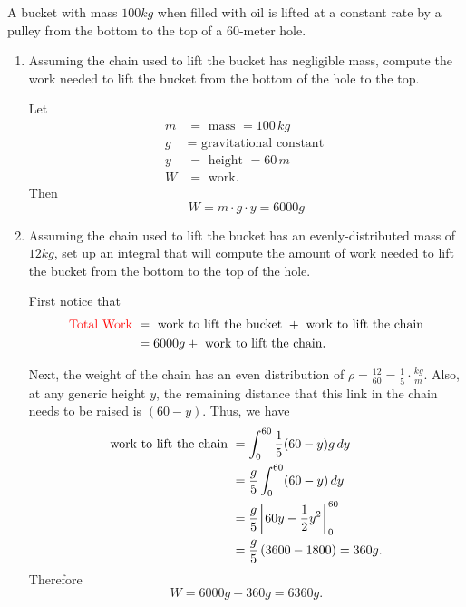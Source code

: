 \documentclass[]{ximera}
\begin{document}
\begin{problem}
\begin{enumerate}
	\end{enumerate}
		
\end{problem}

\begin{instructorNotes}

\end{instructorNotes}







\begin{problem}
A bucket with mass $100kg$ when filled with oil is lifted at a constant rate by a pulley from the bottom to the top of a $60$-meter hole.
	\begin{enumerate}
		\item  Assuming the chain used to lift the bucket has negligible mass, compute the work needed to lift the bucket from the bottom of the hole to the top.  
		\begin{freeResponse}
		Let
			\begin{align*}
			m &= \text{ mass } = 100 \, kg  \\
			g &= \text{ gravitational constant }  \\
			y &= \text{ height } = 60 \, m  \\
			W &= \text{ work}.
			\end{align*}
		Then
			\[
			W = m \cdot g \cdot y = 6000 g
			\]
		\end{freeResponse}
		
		
		
		\item  Assuming the chain used to lift the bucket has an evenly-distributed mass of $12kg$, set up an integral that will compute the amount of work needed to lift the bucket from the bottom to the top of the hole.  
		\begin{freeResponse}
		First notice that
			\begin{align*}
			\text{{\color{red}Total Work} } &= \text{ work to lift the bucket } + \text{ work to lift the chain}  \\
			&= 6000 g + \text{ work to lift the chain}.
			\end{align*}
		
		Next, the weight of the chain has an even distribution of $\rho = \frac{12}{60} = \frac{1}{5} \cdot \frac{kg}{m}$.  
		Also, at any generic height $y$, the remaining distance that this link in the chain needs to be raised is $(60-y)$.  
		Thus, we have
			\begin{align*}
			\text{work to lift the chain } &= \int_0^{60} \frac{1}{5} (60-y) g \,d y  \\
			&= \frac{g}{5} \int_0^{60} (60-y) \,d y  \\
			&= \frac{g}{5} \bigg[ 60y - \frac{1}{2} y^2 \bigg]_0^{60}  \\
			&= \frac{g}{5} \left( 3600 - 1800 \right) = 360g.
			\end{align*}
		Therefore
			\[
			W = 6000g + 360g = 6360g.
			\]
		\end{freeResponse}
		

\end{enumerate}
\end{problem}
\end{document}

